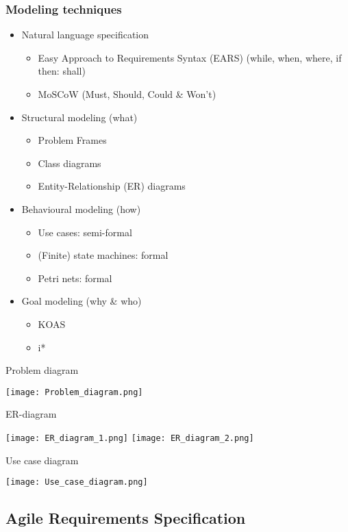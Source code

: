 \subsubsection{Modeling techniques}
\begin{itemize}
	\item Natural language specification
		\begin{itemize}
			\item Easy Approach to Requirements Syntax (EARS) \newline
					(while, when, where, if then: shall)
			\item MoSCoW (Must, Should, Could \& Won't)
		\end{itemize}
	\item Structural modeling (what)
		\begin{itemize}
			\item Problem Frames
			\item Class diagrams
			\item Entity-Relationship (ER) diagrams 
		\end{itemize}
	\item Behavioural modeling (how)
		\begin{itemize}
			\item Use cases: semi-formal
			\item (Finite) state machines: formal
			\item Petri nets: formal
		\end{itemize}
	\item Goal modeling (why \& who)
		\begin{itemize}
			\item KOAS
			\item i*
		\end{itemize}
\end{itemize}
\begin{table}[H]
\caption{Problem diagram}
\texttt{[image: Problem\_diagram.png]}
\end{table}
\begin{table}[H]
\caption{ER-diagram}
\texttt{[image: ER\_diagram\_1.png]}
\texttt{[image: ER\_diagram\_2.png]}
\end{table}
\begin{table}[H]
\caption{Use case diagram}
\texttt{[image: Use\_case\_diagram.png]}
\end{table}
\subsection{Agile Requirements Specification}

 
 
 
 
 